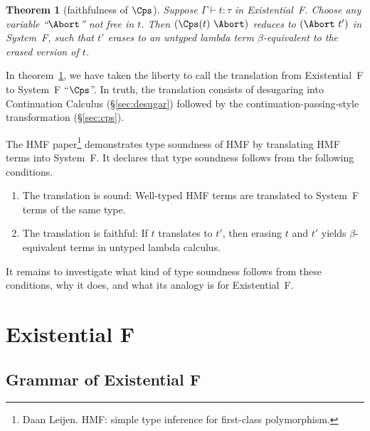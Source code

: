 \documentclass{amsart}
\newtheorem{theorem}[subsection]{Theorem}
\begin{document}
\begin{theorem}
[faithfulness of $\Cps$]
\label{thm:faith}
Suppose $\Gamma\vdash t : \tau$ in Existential~F. Choose any
variable ``\/$\Abort$'' not free in $t$. Then $(\Cps(t)~\Abort)$
reduces to $(\Abort~t')$ in System~F, such that $t'$ erases to an
untyped lambda term $\beta$-equivalent to the erased version of $t$.
\end{theorem}

In theorem~\ref{thm:faith}, we have taken the liberty to
call the translation from Existential~F to System~F ``$\Cps$''.
In truth, the translation consists of desugaring into
Continuation Calculus (\S\ref{sec:desugar}) followed by
the continuation-passing-style transformation (\S\ref{sec:cps}).

The HMF paper\footnote {Daan Leijen. HMF: simple type inference
for first-class polymorphism. } demonstrates type soundness of
HMF by translating HMF terms into System~F. It declares that type
soundness follows from the following conditions.
\begin{enumerate}
\item The translation is sound: Well-typed HMF terms are
translated to System~F terms of the same type.
\item The translation is faithful: If $t$ translates to $t'$,
then erasing $t$ and $t'$ yields $\beta$-equivalent terms in
untyped lambda calculus.
\end{enumerate}
It remains to investigate what kind of type soundness follows
from these conditions, why it does, and what its analogy is for
Existential~F.

\section{Existential F}

\subsection{Grammar of Existential F}

\nc{}

\nc{}

\nc{}
\end{document}
